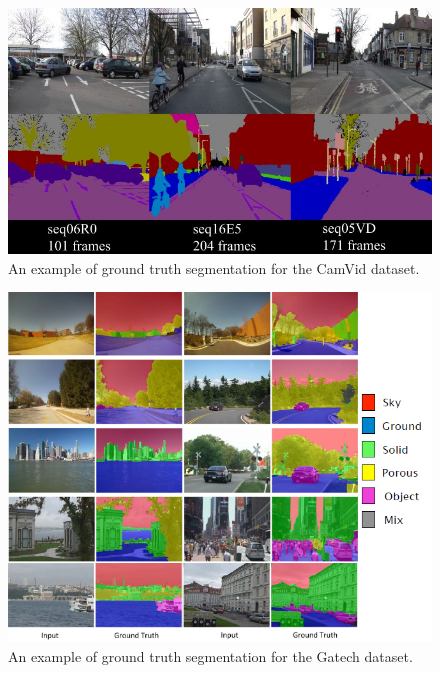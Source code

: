 \begin{figure}[t]
    \centering
    \includegraphics[width=0.8\columnwidth]{img/deconvLSTM/camvid_gt.jpg}
    \caption{An example of ground truth segmentation for the CamVid dataset.}
    \label{fig:deconvlstm_camvid_gt}
\end{figure}

\begin{figure}[t]
    \centering
    \includegraphics[width=\columnwidth]{img/deconvLSTM/gatech_gt.png}
    \caption{An example of ground truth segmentation for the Gatech dataset.}
    \label{fig:deconvLSTM_gatech_gt}
\end{figure}

